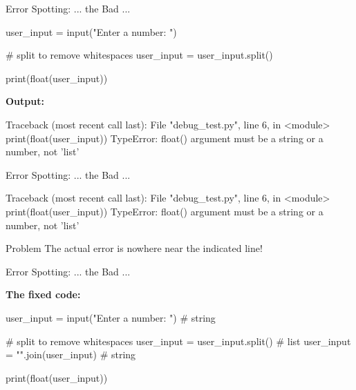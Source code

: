 \begin{frame}[fragile]{Error Spotting: ... the Bad ...}

    \begin{pythoncode}
user_input = input("Enter a number: ")

# split to remove whitespaces
user_input = user_input.split()

print(float(user_input))
    \end{pythoncode}

    \pause
    \textbf{Output:}

    \begin{outputcode}
Traceback (most recent call last):
  File "debug_test.py", line 6, in <module>
    print(float(user_input))
TypeError: float() argument must be a string or a number,
not 'list'
    \end{outputcode}

\end{frame}

\begin{frame}[fragile]{Error Spotting: ... the Bad ...}

    \begin{outputcode}
Traceback (most recent call last):
  File "debug_test.py", line 6, in <module>
    print(float(user_input))
TypeError: float() argument must be a string or a number,
not 'list'
    \end{outputcode}

    \vspace{1em}

    \begin{block}{Problem}
        The actual error is nowhere near the indicated line!
    \end{block}


\end{frame}

\begin{frame}[fragile]{Error Spotting: ... the Bad ...}

    \textbf{The fixed code:}

    \begin{pythoncode}
user_input = input("Enter a number: ")  # string

# split to remove whitespaces
user_input = user_input.split()         # list
user_input = "".join(user_input)        # string

print(float(user_input))
    \end{pythoncode}

\end{frame}

